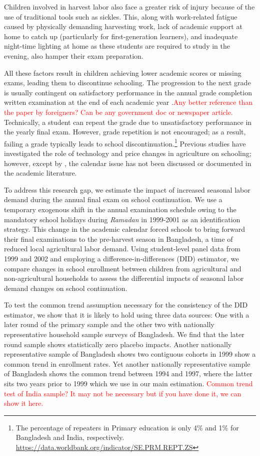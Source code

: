 \documentclass[12pt,letterpaper]{article}
\newcommand{\SAdded}[1]{\textcolor{red}{#1}}
\newcommand{\0}{\ensuremath{\mbox{\boldmath $0$}}}
\begin{document}
Children involved in harvest labor also face a greater risk of injury because of the use of traditional tools such as sickles. This, along with work-related fatigue caused by physically demanding harvesting work, lack of academic support at home to catch up (particularly for first-generation learners), and inadequate night-time lighting at home as these students are required to study in the evening, also hamper their exam preparation. 

All these factors result in children achieving lower academic scores or missing exams, leading them to discontinue schooling. The progression to the next grade is usually contingent on satisfactory performance in the annual grade completion written examination at the end of each academic year \citep{zhongming2017innovative}.\SAdded{Any better reference than the paper by foreigners? Can be any government doc or newspaper article.} 
Technically, a student can repeat the grade due to unsatisfactory performance in the yearly final exam. However, grade repetition is not encouraged; as a result, failing a grade typically leads to school discontinuation.\footnote{The percentage of repeaters in Primary education is only 4\% and 1\% for Bangladesh and India, respectively. \url{https://data.worldbank.org/indicator/SE.PRM.REPT.ZS}} Previous studies have investigated the role of technology and price changes in agriculture on schooling; however, except by , the calendar issue has not been discussed or documented in the academic literature. 

To address this research gap, we estimate the impact of increased seasonal labor demand during the annual final exam on school continuation. We use a temporary exogenous shift in the annual examination schedule owing to the mandatory school holidays during \textit{Ramadan} in 1999-2001 as an identification strategy. This change in the academic calendar forced schools to bring forward their final examinations to the pre-harvest season in Bangladesh, a time of reduced local agricultural labor demand. Using student-level panel data from 1999 and 2002 and employing a difference-in-differences (DID) estimator, we compare changes in school enrollment between children from agricultural and non-agricultural households to assess the differential impacts of seasonal labor demand changes on school continuation. 


To test the common trend assumption necessary for the consistency of the DID estimator, we show that it is likely to hold using three data sources: One with a later round of the primary sample and the other two with nationally representative household sample surveys of Bangladesh. We find that the later round sample shows statistically zero placebo impacts. Another nationally representative sample of Bangladesh shows two contiguous cohorts in 1999 show a common trend in enrollment rates. Yet another nationally representative sample of Bangladesh shows the common trend between 1994 and 1997, where the latter sits two years prior to 1999 which we use in our main estimation. \SAdded{Common trend test of India sample? It may not be necessary but if you have done it, we can show it here.}
\end{document}
